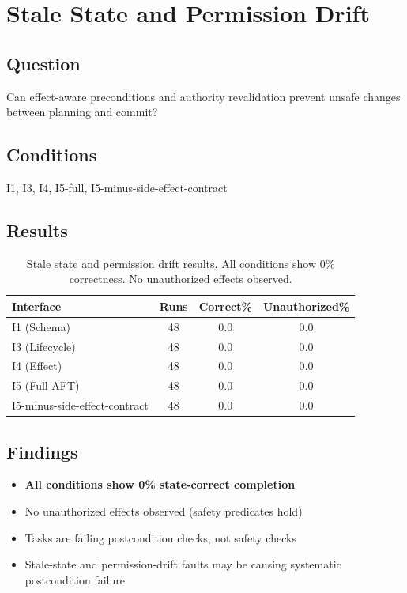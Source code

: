 
\section{Stale State and Permission Drift}

\subsection{Question}
Can effect-aware preconditions and authority revalidation prevent unsafe changes between planning and commit?

\subsection{Conditions}
I1, I3, I4, I5-full, I5-minus-side-effect-contract

\subsection{Results}

\begin{table}[h]
\centering
\begin{tabular}{lccc}
\hline
\textbf{Interface} & \textbf{Runs} & \textbf{Correct\%} & \textbf{Unauthorized\%} \\
\hline
I1 (Schema) & 48 & 0.0 & 0.0 \\
I3 (Lifecycle) & 48 & 0.0 & 0.0 \\
I4 (Effect) & 48 & 0.0 & 0.0 \\
I5 (Full AFT) & 48 & 0.0 & 0.0 \\
I5-minus-side-effect-contract & 48 & 0.0 & 0.0 \\
\hline
\end{tabular}
\caption{Stale state and permission drift results. All conditions show 0\% correctness. No unauthorized effects observed.}
\label{tab:stale_permission}
\end{table}

\subsection{Findings}
\begin{itemize}
    \item \textbf{All conditions show 0\% state-correct completion}
    \item No unauthorized effects observed (safety predicates hold)
    \item Tasks are failing postcondition checks, not safety checks
    \item Stale-state and permission-drift faults may be causing systematic postcondition failure
\end{itemize}

